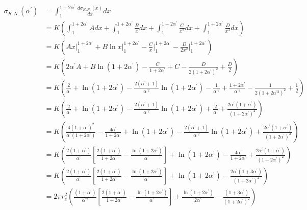 \begin{align}
  \sigma_{K.N.}(\alpha^{'}) & = \int_1^{1+2\alpha^{'}} \frac{d\sigma_{K.N.}(x)}{dx} dx
  \nonumber \\
  & = K \left(\int_1^{1+2\alpha^{'}} A dx + 
    \int_1^{1+2\alpha^{'}} \frac{B}{x} dx + 
    \int_1^{1+2\alpha^{'}} \frac{C}{x^2} dx + 
    \int_1^{1+2\alpha^{'}} \frac{D}{x^3} dx \right) \nonumber \\
  & = K \left(Ax \Bigg|_1^{1+2\alpha^{'}} + B\ln{x}\Bigg|_1^{1+2\alpha^{'}} -
    \frac{C}{x} \Bigg|_1^{1+2\alpha^{'}} - \frac{D}{2x^2} \Bigg|_1^{1+2\alpha^{'}}
    \right) \nonumber \\
  & = K \left(2\alpha^{'}A + B\ln{(1+2\alpha^{'})} - \frac{C}{1+2\alpha^{'}} + C -
    \frac{D}{2(1+2\alpha^{'})^2} + \frac{D}{2} \right) \nonumber \\
  & = K \left(\frac{2}{\alpha^{'}} + \ln{(1 + 2\alpha^{'})} -
    \frac{2(\alpha^{'}+1)}{\alpha^{'2}}\ln{(1+2\alpha^{'})} - 
    \frac{1}{\alpha^{'2}} + \frac{1+2\alpha^{'}}{\alpha^{'2}} - 
    \frac{1}{2(1+2\alpha^{'2})^2} + \frac{1}{2} \right) \nonumber \\
  & = K \left(\frac{2}{\alpha^{'}} + \ln{(1 + 2\alpha^{'})} -
    \frac{2(\alpha^{'}+1)}{\alpha^{'2}}\ln{(1+2\alpha^{'})} + 
    \frac{2}{\alpha^{'}} + \frac{2\alpha^{'}(1+\alpha^{'})}{(1+2\alpha^{'})^2} 
    \right) \nonumber \\
  & = K \left(\frac{4(1+\alpha^{'})^2}{\alpha^{'}(1+2\alpha^{'})} - 
      \frac{4\alpha^{'}}{1+2\alpha^{'}} + \ln{(1 + 2\alpha^{'})} -
    \frac{2(\alpha^{'}+1)}{\alpha^{'2}}\ln{(1+2\alpha^{'})} + 
    \frac{2\alpha^{'}(1+\alpha^{'})}{(1+2\alpha^{'})^2} 
    \right) \nonumber \\
  & = K \left(\frac{2(1+\alpha^{'})}{\alpha^{'}} 
    \left[\frac{2(1+\alpha^{'})}{1+2\alpha^{'}} - 
    \frac{\ln{(1+2\alpha^{'})}}{\alpha^{'}} \right] + \ln{(1 + 2\alpha^{'})} -
    \frac{4\alpha^{'}}{1+2\alpha^{'}} + 
    \frac{2\alpha^{'}(1+\alpha^{'})}{(1+2\alpha^{'})^2} \right) \nonumber \\
  & = K \left(\frac{2(1+\alpha^{'})}{\alpha^{'}} 
    \left[\frac{2(1+\alpha^{'})}{1+2\alpha^{'}} - 
    \frac{\ln{(1+2\alpha^{'})}}{\alpha^{'}} \right] + \ln{(1 + 2\alpha^{'})} -
    \frac{2\alpha^{'}(1+3\alpha^{'})}{(1+2\alpha^{'})^2} \right) \nonumber \\
  & = 2\pi r_e^2 \left(\frac{(1+\alpha^{'})}{\alpha^{'2}} 
    \left[\frac{2(1+\alpha^{'})}{1+2\alpha^{'}} - 
    \frac{\ln{(1+2\alpha^{'})}}{\alpha^{'}} \right] +
    \frac{\ln{(1 + 2\alpha^{'})}}{2\alpha^{'}} - 
    \frac{(1+3\alpha^{'})}{(1+2\alpha^{'})^2} \right) 
\end{align}

